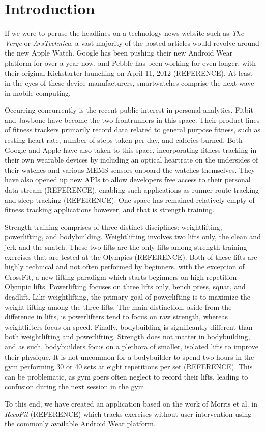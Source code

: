\chapter{Introduction}

If we were to peruse the headlines on a technology news website such as \textit{The Verge} or \textit{ArsTechnica}, a vast majority of the posted articles would revolve around the new Apple Watch. Google has been pushing their new Android Wear platform for over a year now, and Pebble has been working for even longer, with their original Kickstarter launching on April 11, 2012 (REFERENCE). At least in the eyes of these device manufacturers, smartwatches comprise the next wave in mobile computing. 

Occurring concurrently is the recent public interest in personal analytics. Fitbit and Jawbone have become the two frontrunners in this space. Their product lines of fitness trackers primarily record data related to general purpose fitness, such as resting heart rate, number of steps taken per day, and calories burned. Both Google and Apple have also taken to this space, incorporating fitness tracking in their own wearable devices by including an optical heartrate on the undersides of their watches and various MEMS sensors onboard the watches themselves. They have also opened up new APIs to allow developers free access to their personal data stream (REFERENCE), enabling such applications as runner route tracking and sleep tracking (REFERENCE). One space has remained relatively empty of fitness tracking applications however, and that is strength training.

Strength training comprises of three distinct disciplines: weightlifting, powerlifting, and bodybuilding. Weightlifting involves two lifts only, the clean and jerk and the snatch. These two lifts are the only lifts among strength training exercises that are tested at the Olympics (REFERENCE). Both of these lifts are highly technical and not often performed by beginners, with the exception of CrossFit, a new lifting paradigm which starts beginners on high-repetition Olympic lifts. Powerlifting focuses on three lifts only, bench press, squat, and deadlift. Like weightlifting, the primary goal of powerlifting is to maximize the weight lifting among the three lifts. The main distinction, aside from the difference in lifts, is powerlifters tend to focus on raw strength, whereas weightlifters focus on speed. Finally, bodybuilding is significantly different than both weightlifting and powerlifting. Strength does not matter in bodybuilding, and as such, bodybuilders focus on a plethora of smaller, isolated lifts to improve their physique. It is not uncommon for a bodybuilder to spend two hours in the gym performing 30 or 40 sets at eight repetitions per set (REFERENCE). This can be problematic, as gym goers often neglect to record their lifts, leading to confusion during the next session in the gym. 

To this end, we have created an application based on the work of Morris et al. in \textit{RecoFit} (REFERENCE) which tracks exercises without user intervention using the commonly available Android Wear platform. 